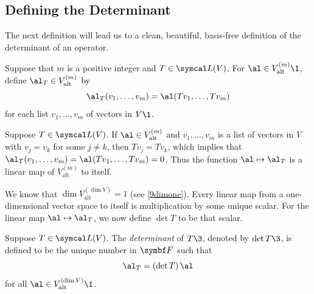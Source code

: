 \subsection{Defining the Determinant}

The next definition will lead us to a clean, beautiful, basis-free definition of the determinant of an operator.

{Suppose that $m$ is a positive integer and $T \in \L(V)$. For $\al \in V_{\text{alt}}^{(m)}\1$, define $\al_T \in V^{(m)}_{\text{alt}}$ by
\[
\al_T(v_1, \ldots, v_m) = \al(Tv_1, \ldots, T v_m)
\]
for each list $v_1, \ldots, v_m$ of vectors in $V\1$.}

Suppose $T \in \L(V)$. If $\al \in V^{(m)}_{\text{alt}}$ and $v_1, \ldots, v_m$ is a list of vectors in $V$ with $v_j = v_k$ for some $j \ne k$, then $Tv_j = Tv_k$, which implies that $\al_T(v_1, \ldots, v_m) = \al(Tv_1, \ldots, T v_m) = 0$. Thus the function $\al \mapsto \al_T$ is a linear map of $V^{(m)}_{\text{alt}}$ to itself.

We know that $\dim V^{(\dim V)}_{\text{alt}} = 1$ (see \ref{9dimone}). Every linear map from a one-dimensional vector space to itself is multiplication by some unique scalar. For the linear map $\al \mapsto \al_T$, we now define $\det T$ to be that scalar.

{Suppose $T \in \L(V)$. The \emph{determinant} of $T\3$, denoted by $\det T\3$, is defined to be the unique number in $\F{}$ such that
\[
\al_T = (\det T) \, \al
\]
for all $\al \in V_{\text{alt}}^{(\dim V)}\1$.}


